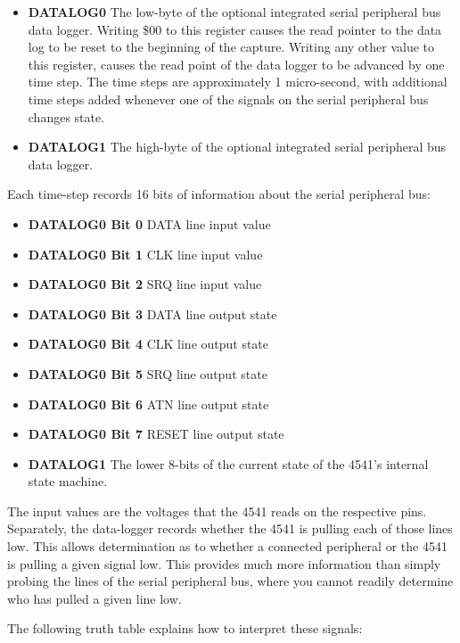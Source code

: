 \begin{itemize}
  \item {\bf DATALOG0} The low-byte of the optional integrated serial
    peripheral bus data logger.  Writing \$00 to this register causes
    the read pointer to the data log to be reset to the beginning of
    the capture. Writing any other value to this register, causes the
    read point of the data logger to be advanced by one time step.
    The time steps are approximately 1 micro-second, with additional
    time steps added whenever one of the signals on the serial
    peripheral bus changes state.
    \item {\bf DATALOG1} The high-byte of the optional integrated serial
      peripheral bus data logger.
\end{itemize}

Each time-step records 16 bits of information about the serial
peripheral bus:
\begin{itemize}
\item {\bf DATALOG0 Bit 0} DATA line input value
\item {\bf DATALOG0 Bit 1} CLK line input value
\item {\bf DATALOG0 Bit 2} SRQ line input value
\item {\bf DATALOG0 Bit 3} DATA line output state
\item {\bf DATALOG0 Bit 4} CLK line output state
\item {\bf DATALOG0 Bit 5} SRQ line output state
\item {\bf DATALOG0 Bit 6} ATN line output state
\item {\bf DATALOG0 Bit 7} RESET line output state
\item {\bf DATALOG1} The lower 8-bits of the current state of the 4541's internal state machine.
\end{itemize}

The input values are the voltages that the 4541 reads on the
respective pins.  Separately, the data-logger records whether the 4541
is pulling each of those lines low.  This allows determination as to
whether a connected peripheral or the 4541 is pulling a given signal
low. This provides much more information than simply probing the lines
of the serial peripheral bus, where you cannot readily determine who
has pulled a given line low.

The following truth table explains how to interpret these signals:

